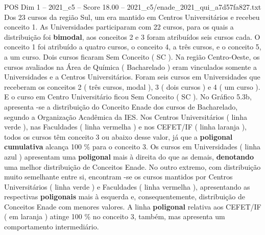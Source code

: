 \begin{textsample}{POS Dim 1 – 2021\_c5 – Score 18.00 – 2021\_c5/enade\_2021\_qui\_a7d57fa827.txt}
Dos 23 cursos da região Sul, um era mantido em Centros Universitários e recebeu conceito 1.
As Universidades participaram com 22 cursos, para os quais a distribuição foi \textbf{bimodal}, aos conceitos 2 e 3 foram atribuídos seis cursos cada.
O conceito 1 foi atribuído a quatro cursos, o conceito 4, a três cursos, e o conceito 5, a um curso.
Dois cursos ficaram Sem Conceito ( SC ).
Na região Centro-Oeste, os cursos avaliados na Área de Química ( Bacharelado ) eram vinculados somente a Universidades e a Centros Universitários.
Foram seis cursos em Universidades que receberam os conceitos 2 ( três cursos, modal ), 3 ( dois cursos ) e 4 ( um curso ).
E o curso em Centro Universitário ficou Sem Conceito ( SC ).
No Gráfico 5.3b, apresenta -se a distribuição do Conceito Enade dos cursos de Bacharelado, segundo a Organização Acadêmica da IES.
Nos Centros Universitários ( linha verde ), nas Faculdades ( linha vermelha ) e nos CEFET/IF ( linha laranja ), todos os cursos têm conceito 3 ou abaixo desse valor, já que a \textbf{poligonal} \textbf{cumulativa} alcança 100 \% para o conceito 3.
Os cursos em Universidades ( linha azul ) apresentam uma \textbf{poligonal} mais à direita do que as demais, \textbf{denotando} uma melhor distribuição de Conceitos Enade.
No outro extremo, com distribuição muito semelhante entre si, encontram -se os cursos mantidos por Centros Universitários ( linha verde ) e Faculdades ( linha vermelha ), apresentando as respectivas \textbf{poligonais} mais à esquerda e, consequentemente, distribuição de Conceitos Enade com menores valores.
A linha \textbf{poligonal} relativa aos CEFET/IF ( em laranja ) atinge 100 \% no conceito 3, também, mas apresenta um comportamento intermediário.

\end{textsample}
